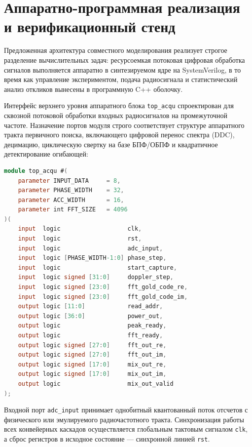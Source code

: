 \section{Аппаратно-программная реализация и верификационный стенд}

Предложенная архитектура совместного моделирования реализует строгое разделение вычислительных задач: ресурсоемкая потоковая цифровая обработка сигналов выполняется аппаратно в синтезируемом ядре на SystemVerilog, в то время как управление экспериментом, подача радиосигнала и статистический анализ откликов вынесены в программную C++ оболочку.

Интерфейс верхнего уровня аппаратного блока \texttt{top\_acqu} спроектирован для сквозной потоковой обработки входных радиосигналов на промежуточной частоте. Назначение портов модуля строго соответствует структуре аппаратного тракта первичного поиска, включающего цифровой перенос спектра (DDC), децимацию, циклическую свертку на базе БПФ/ОБПФ и квадратичное детектирование огибающей:

\begin{lstlisting}[language=Verilog, caption={Interface of top\_acqu module}, label={lst:top_acqu}]
module top_acqu #(
    parameter INPUT_DATA     = 8,
    parameter PHASE_WIDTH    = 32,
    parameter ACC_WIDTH      = 16,
    parameter int FFT_SIZE   = 4096
)(
    input  logic                   clk,
    input  logic                   rst,
    input  logic                   adc_input,
    input  logic [PHASE_WIDTH-1:0] phase_step,
    input  logic                   start_capture,
    input  logic signed [31:0]     doppler_step,
    input  logic signed [23:0]     fft_gold_code_re,
    input  logic signed [23:0]     fft_gold_code_im,
    output logic [11:0]            read_addr,
    output logic [36:0]            power_out,
    output logic                   peak_ready,
    output logic                   fft_ready,
    output logic signed [27:0]     fft_out_re,
    output logic signed [27:0]     fft_out_im,
    output logic signed [17:0]     mix_out_re,
    output logic signed [17:0]     mix_out_im,
    output logic                   mix_out_valid
);
\end{lstlisting}

Входной порт \texttt{adc\_input} принимает однобитный квантованный поток отсчетов с физического или эмулируемого радиочастотного тракта. Синхронизация работы всех конвейерных каскадов осуществляется глобальным тактовым сигналом \texttt{clk}, а сброс регистров в исходное состояние — синхронной линией \texttt{rst}. 

